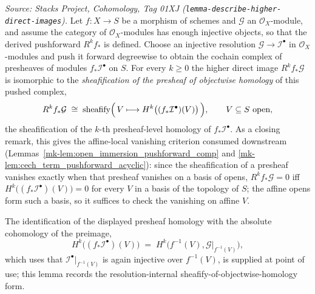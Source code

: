 \begin{lemma}
  \label{mk-lem:higher_direct_image_presheaf}

  \textit{Source: Stacks Project, Cohomology, Tag 01XJ
  (\texttt{lemma-describe-higher-direct-images}).}
  Let \(f : X \to S\) be a morphism of schemes and \(\mathcal{G}\) an
  \(\mathcal{O}_X\)-module, and assume the category of \(\mathcal{O}_X\)-modules has
  enough injective objects, so that the derived pushforward \(R^k f_*\) is defined.
  Choose an injective resolution \(\mathcal{G} \to \mathcal{I}^\bullet\) in
  \(\mathcal{O}_X\)-modules and push it forward degreewise to obtain the cochain complex
  of presheaves of modules \(f_*\mathcal{I}^\bullet\) on \(S\). For every \(k \geq 0\)
  the higher direct image \(R^k f_*\mathcal{G}\) is isomorphic to the
  \emph{sheafification of the presheaf of objectwise homology} of this pushed complex,
  \[
    R^k f_*\mathcal{G}
      \;\cong\;
    \operatorname{sheafify}\Bigl(\,V \longmapsto
      H^k\bigl((f_*\mathcal{I}^\bullet)(V)\bigr)\,\Bigr),
    \qquad V \subseteq S \text{ open},
  \]
  the sheafification of the \(k\)-th presheaf-level homology of
  \(f_*\mathcal{I}^\bullet\). As a closing remark, this gives the affine-local
  vanishing criterion consumed downstream
  (Lemmas~\ref{mk-lem:open_immersion_pushforward_comp} and
  \ref{mk-lem:cech_term_pushforward_acyclic}): since the sheafification of a presheaf
  vanishes exactly when that presheaf vanishes on a basis of opens,
  \(R^k f_*\mathcal{G} = 0\) iff \(H^k\bigl((f_*\mathcal{I}^\bullet)(V)\bigr) = 0\)
  for every \(V\) in a basis of the topology of \(S\); the affine opens form such a
  basis, so it suffices to check the vanishing on affine \(V\).

  The identification of the displayed presheaf homology with the absolute cohomology
  of the preimage,
  \[
    H^k\bigl((f_*\mathcal{I}^\bullet)(V)\bigr)
      \;=\;
    H^k\bigl(f^{-1}(V), \mathcal{G}|_{f^{-1}(V)}\bigr),
  \]
  which uses that \(\mathcal{I}^\bullet|_{f^{-1}(V)}\) is again injective over
  \(f^{-1}(V)\), is supplied at point of use; this lemma records the
  resolution-internal sheafify-of-objectwise-homology form.
\end{lemma}

